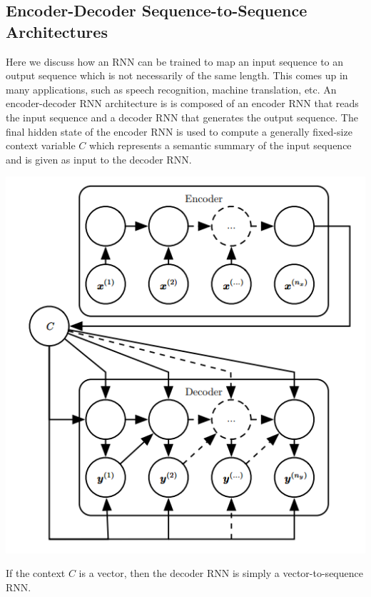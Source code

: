 \subsection{Encoder-Decoder Sequence-to-Sequence Architectures}
Here we discuss how an RNN can be trained to map an input sequence to an output sequence which is not necessarily of the same length. This comes up in many applications, such as speech recognition, machine translation, etc.\newline\newline
An encoder-decoder RNN architecture is is composed of an encoder RNN that reads the input sequence and a decoder RNN that generates the output sequence. The final hidden state of the encoder RNN is used to compute a generally fixed-size context variable $C$ which represents a semantic summary of the input sequence and is given as input to the decoder RNN.
\begin{center}
    \includegraphics[]{images/encoder-decoder rnn.png}
\end{center}
If the context $C$ is a vector, then the decoder RNN is simply a vector-to-sequence RNN.

